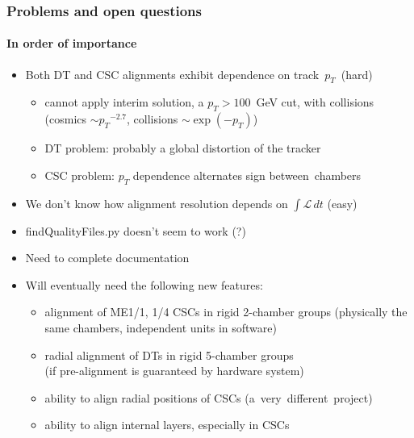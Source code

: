 \documentclass[compress]{beamer}
\begin{document}
\begin{frame}
\frametitle{Problems and open questions}
\framesubtitle{In order of importance}

\begin{itemize}
\item Both DT and CSC alignments exhibit dependence on \mbox{track $p_T$ (hard)\hspace{-1 cm}}
\begin{itemize}\setlength{\itemsep}{0.1 cm}
\item cannot apply interim solution, a $p_T > 100$~GeV cut, with collisions (cosmics $\sim {p_T}^{-2.7}$, collisions $\sim \exp(-{p_T})$)
\item DT problem: probably a global distortion of the tracker
\item CSC problem: $p_T$ dependence alternates sign \mbox{between chambers\hspace{-1 cm}}
\end{itemize}

\item We don't know how alignment resolution depends on $\int \mathcal{L} \, dt$ (easy)

\item findQualityFiles.py doesn't seem to work (?)

\item Need to complete documentation

\item Will eventually need the following new features:
\begin{itemize}\setlength{\itemsep}{0.1 cm}
\item alignment of ME1/1, 1/4 CSCs in rigid 2-chamber groups (physically the same chambers, independent units in software)
\item radial alignment of DTs in rigid 5-chamber groups \\ (if pre-alignment is guaranteed by hardware system)
\item ability to align radial positions of CSCs \mbox{(a very different project)\hspace{-1 cm}}
\item ability to align internal layers, especially in CSCs
\end{itemize}
\end{itemize}
\end{frame}
\end{document}
